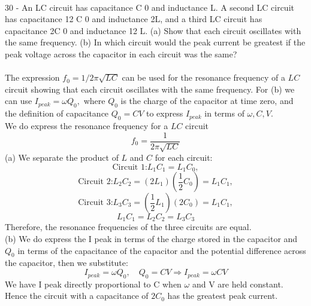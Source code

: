\documentclass{report}
\begin{document}
\paragraph{}
30 - An LC circuit has capacitance C 0 and inductance L. A second LC circuit has capacitance 12 C 0 and inductance 2L, and a third LC circuit has capacitance 2C 0 and inductance 12 L. (a) Show that each circuit oscillates with the same frequency. (b) In which circuit would the peak current be greatest if the peak voltage across the capacitor in each circuit was the same?\\
\\
The expression $f_0 = 1 / 2\pi \sqrt{LC}$ can be used for the resonance frequency of a $LC$ circuit showing that each circuit oscillates with the same frequency. For (b) we can use $I_{peak} = \omega Q_0,$ where $Q_0$ is the charge of the capacitor at time zero, and the definition of capacitance $Q_0 = CV$ to express $I_{peak}$ in terms of $\omega, C, V$.\\
We do express the resonance frequency for a $LC$ circuit 
$$f_0 = \frac{1}{2\pi \sqrt{LC}}$$
(a) We separate the product of $L$ and $C$ for each circuit:
$$\text{Circuit 1:} L_1C_1 = L_1C_0,$$
$$\text{Circuit 2:} L_2C_2 = (2L_1)(\frac{1}{2}C_0) = L_1C_1,$$
$$\text{Circuit 3:} L_3C_3 = (\frac{1}{2}L_1)(2C_0) = L_1C_1,$$
$$L_1C_1 = L_2C_2 = L_3C_3$$
Therefore, the resonance frequencies of the three circuits are equal.\\
(b) We do express the I peak in terms of the charge stored in the capacitor and $Q_0$ in terms of the capacitance of the capacitor and the potential difference across the capacitor, then we substitute:
$$I_{peak} = \omega Q_0, \quad Q_0 = CV \Rightarrow I_{peak} = \omega CV$$
We have I peak directly proportional to C when $\omega$ and V are held constant. Hence the circuit with a capacitance of $2C_0$ has the greatest peak current.
\end{document}
